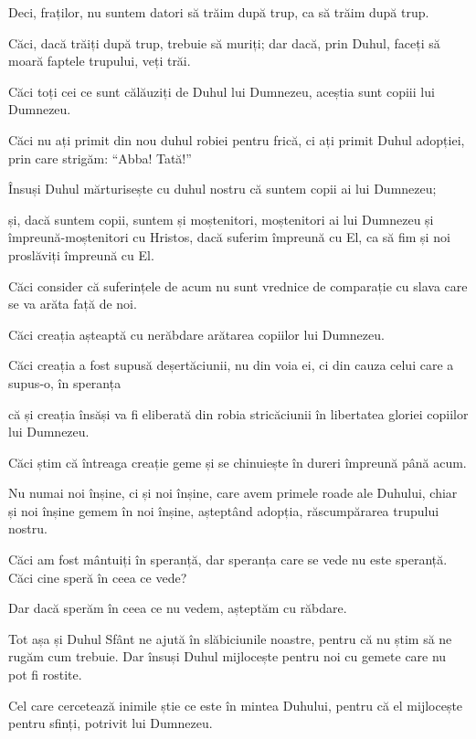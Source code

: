 {\par }{\PP {}Deci, fraților, nu suntem datori să trăim după trup, ca să trăim după trup.

Căci, dacă trăiți după trup, trebuie să muriți; dar dacă, prin Duhul, faceți să moară faptele trupului, veți trăi.

Căci toți cei ce sunt călăuziți de Duhul lui Dumnezeu, aceștia sunt copiii lui Dumnezeu.

Căci nu ați primit din nou duhul robiei pentru frică, ci ați primit Duhul adopției, prin care strigăm: “Abba! Tată!”


\par }{\PP {}Însuși Duhul mărturisește cu duhul nostru că suntem copii ai lui Dumnezeu;

și, dacă suntem copii, suntem și moștenitori, moștenitori ai lui Dumnezeu și împreună-moștenitori cu Hristos, dacă suferim împreună cu El, ca să fim și noi proslăviți împreună cu El.


\par }{\PP {}Căci consider că suferințele de acum nu sunt vrednice de comparație cu slava care se va arăta față de noi.

Căci creația așteaptă cu nerăbdare arătarea copiilor lui Dumnezeu.

Căci creația a fost supusă deșertăciunii, nu din voia ei, ci din cauza celui care a supus-o, în speranța

că și creația însăși va fi eliberată din robia stricăciunii în libertatea gloriei copiilor lui Dumnezeu.

Căci știm că întreaga creație geme și se chinuiește în dureri împreună până acum.

Nu numai noi înșine, ci și noi înșine, care avem primele roade ale Duhului, chiar și noi înșine gemem în noi înșine, așteptând adopția, răscumpărarea trupului nostru.

Căci am fost mântuiți în speranță, dar speranța care se vede nu este speranță. Căci cine speră în ceea ce vede?

Dar dacă sperăm în ceea ce nu vedem, așteptăm cu răbdare.


\par }{\PP {}Tot așa și Duhul Sfânt ne ajută în slăbiciunile noastre, pentru că nu știm să ne rugăm cum trebuie. Dar însuși Duhul mijlocește pentru noi cu gemete care nu pot fi rostite.

Cel care cercetează inimile știe ce este în mintea Duhului, pentru că el mijlocește pentru sfinți, potrivit lui Dumnezeu.


}
